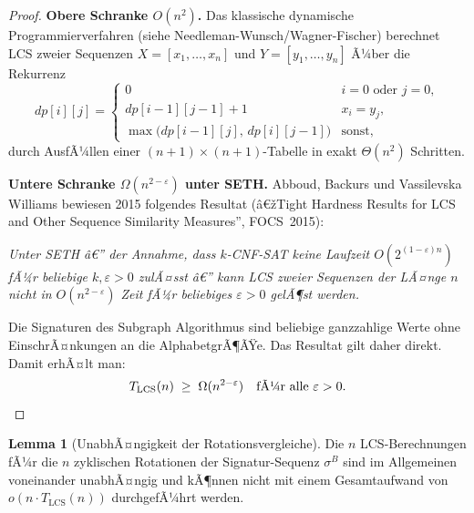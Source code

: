 ﻿\documentclass[a4paper,12pt]{article}
\theoremstyle{definition}
\newtheorem{lemma}{Lemma}
\begin{document}
\begin{proof}
\textbf{Obere Schranke $O(n^2)$.}
Das klassische dynamische Programmierverfahren (siehe Needleman-Wunsch/Wagner-Fischer) berechnet LCS zweier Sequenzen $X = [x_1, \ldots, x_n]$ und $Y = [y_1, \ldots, y_n]$ Ã¼ber die Rekurrenz
\[
	dp[i][j] = \begin{cases}
		0 & i = 0 \text{ oder } j = 0, \\
		dp[i-1][j-1] + 1 & x_i = y_j, \\
		\max\!\bigl(dp[i-1][j],\, dp[i][j-1]\bigr) & \text{sonst,}
	\end{cases}
\]
durch AusfÃ¼llen einer $(n+1)\times(n+1)$-Tabelle in exakt $\Theta(n^2)$ Schritten.

\textbf{Untere Schranke $\Omega(n^{2-\varepsilon})$ unter SETH.}
Abboud, Backurs und Vassilevska Williams bewiesen 2015 folgendes Resultat
(â€žTight Hardness Results for LCS and Other Sequence Similarity Measures'', FOCS~2015):

\medskip
\emph{Unter SETH â€” der Annahme, dass $k$-CNF-SAT keine Laufzeit $O(2^{(1-\varepsilon)n})$ fÃ¼r beliebige $k, \varepsilon > 0$ zulÃ¤sst â€” kann LCS zweier Sequenzen der LÃ¤nge $n$ nicht in $O(n^{2-\varepsilon})$ Zeit fÃ¼r beliebiges $\varepsilon > 0$ gelÃ¶st werden.}
\medskip

Die Signaturen des Subgraph Algorithmus sind beliebige ganzzahlige Werte ohne EinschrÃ¤nkungen an die AlphabetgrÃ¶ÃŸe.
Das Resultat gilt daher direkt. Damit erhÃ¤lt man:
\[
	T_{\mathrm{LCS}}(n) \;\geq\; \Omega(n^{2-\varepsilon}) \quad \text{fÃ¼r alle } \varepsilon > 0. \qedhere
\]
\end{proof}

\begin{lemma}[UnabhÃ¤ngigkeit der Rotationsvergleiche]
\label{lem:unabhaengigkeit}
Die $n$ LCS-Berechnungen fÃ¼r die $n$ zyklischen Rotationen der Signatur-Sequenz $\sigma^B$
sind im Allgemeinen voneinander unabhÃ¤ngig und kÃ¶nnen nicht mit einem Gesamtaufwand von $o(n \cdot T_{\mathrm{LCS}}(n))$ durchgefÃ¼hrt werden.
\end{lemma}
\end{document}
